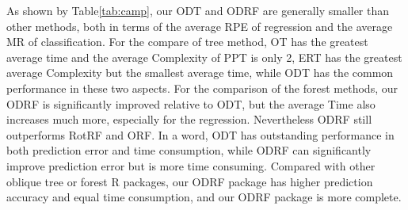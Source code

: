\documentclass[nojss]{jss}
\numberwithin{equation}{section}
\begin{document}
As shown by Table\ref{tab:camp}, our ODT and ODRF are generally smaller than other methods, both in terms of the average RPE of regression and the average MR of classification. For the compare of tree method, OT has the greatest average time and the average Complexity of PPT is only 2, ERT has the greatest average Complexity but the smallest average time, while ODT has the common performance in these two aspects. For the comparison of the forest methods, our ODRF is significantly improved relative to ODT, but the average Time also increases much more, especially for the regression. Nevertheless ODRF still outperforms RotRF and ORF. In a word, ODT has outstanding performance in both prediction error and time consumption, while ODRF can significantly improve prediction error but is more time consuming. Compared with other oblique tree or forest R packages, our ODRF package has higher prediction accuracy and equal time consumption, and our ODRF package is more complete.
\end{document}
